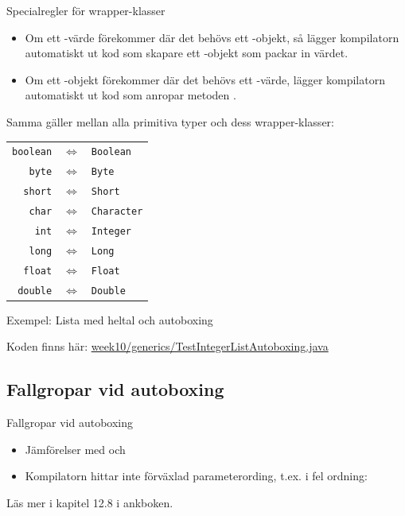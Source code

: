 \documentclass{lecturenotes}
\begin{document}
\begin{Slide}{Specialregler för wrapper-klasser}\footnotesize
\begin{itemize}
\item Om ett -värde förekommer där det behövs ett -objekt, så lägger kompilatorn automatiskt ut kod som skapare ett -objekt som packar in värdet.
\item Om ett -objekt förekommer där det behövs ett -värde, lägger kompilatorn automatiskt ut kod som anropar metoden .
\end{itemize}
Samma gäller mellan alla primitiva typer och dess wrapper-klasser: 
\begin{table}
\center
\begin{tabular}{r c l}
 {\lstinline!boolean!} &$\Leftrightarrow$& {\lstinline!Boolean!} \\
 {\lstinline!byte!} &$\Leftrightarrow$& {\lstinline!Byte!}\\
 {\lstinline!short!}&$\Leftrightarrow$& {\lstinline!Short!}\\
 {\lstinline!char!} &$\Leftrightarrow$& {\lstinline!Character!}\\
 {\lstinline!int!} &$\Leftrightarrow$& {\lstinline!Integer!}\\
 {\lstinline!long!} &$\Leftrightarrow$& {\lstinline!Long!}\\
 {\lstinline!float!} &$\Leftrightarrow$& {\lstinline!Float!}\\
 {\lstinline!double!} &$\Leftrightarrow$&{\lstinline!Double!}\\
\end{tabular}
\end{table}
\end{Slide}

\begin{Slide}{Exempel: Lista med heltal och autoboxing}

\scriptsize Koden finns här: \href{https://github.com/bjornregnell/lth-eda016-2015/blob/master/lectures/examples/eclipse-ws/lecture-examples/src/week10/generics/TestIntegerList.java}{week10/generics/TestIntegerListAutoboxing.java}
\end{Slide}

\subsection{Fallgropar vid autoboxing}
\begin{Slide}{Fallgropar vid autoboxing}
\begin{itemize}
\item Jämförelser med \code{==} och \code{!=}
\item Kompilatorn hittar inte förväxlad parameterording, t.ex.  i fel ordning: \sout{}
\end{itemize}
Läs mer i kapitel 12.8 i ankboken.
\end{Slide}
\end{document}
